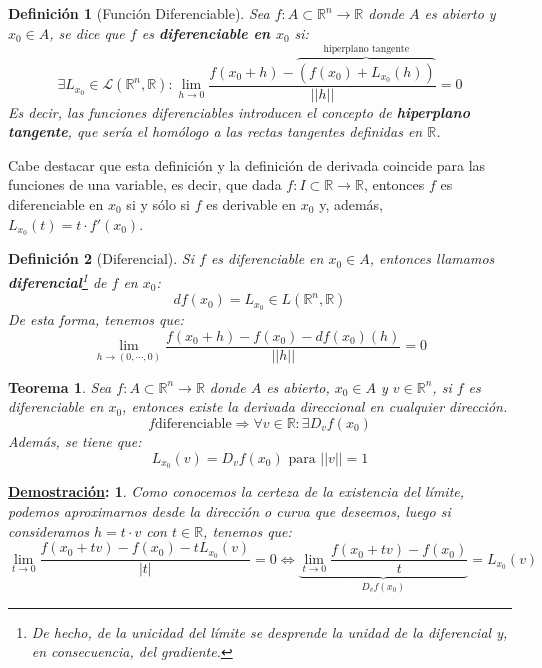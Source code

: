 \documentclass[10pt,a4paper,openright]{book}
\theoremstyle{break}
\newtheorem*{defi}{Definición}
\newtheorem*{theo}{Teorema}
\newtheorem*{demo}{\underline{Demostración}:}
\begin{document}
\begin{defi}[Función Diferenciable]
Sea $f: A \subset \mathbb{R}^n \to \mathbb{R}$ donde $A$ es abierto y $x_0 \in A$, se dice que $f$ es \textbf{diferenciable en $x_0$} si:
$$\exists L_{x_0} \in \mathcal{L}(\mathbb{R}^n, \mathbb{R}) : \lim_{h\rightarrow 0} \frac{f(x_0 + h) - \overbrace{\left( f(x_0) + L_{x_0}(h)\right)}^{\mbox{hiperplano tangente}}}{||h||}  = 0$$
Es decir, las funciones diferenciables introducen el concepto de \textbf{hiperplano tangente}, que sería el homólogo a las rectas tangentes definidas en $\mathbb{R}$.
\end{defi}

Cabe destacar que esta definición y la definición de derivada coincide para las funciones de una variable, es decir, que dada $f: I \subset \mathbb{R} \to \mathbb{R}$, entonces $f$ es diferenciable en $x_0$ si y sólo si $f$ es derivable en $x_0$ y, además, $L_{x_0} (t) = t \cdot f'(x_0)$.

\begin{defi}[Diferencial]
Si $f$ es diferenciable en $x_0\in A$, entonces llamamos \textbf{diferencial}\footnote{De hecho, de la unicidad del límite se desprende la unidad de la diferencial y, en consecuencia, del gradiente.} de $f$ en $x_0$:
$$df(x_0) = L_{x_0}\in L(\mathbb{R}^n, \mathbb{R})$$
De esta forma, tenemos que:
$$\lim_{h\rightarrow (0,\cdots, 0)} \frac{f(x_0+h) -f(x_0) -df(x_0)(h)}{||h||} = 0$$
\end{defi}

\begin{theo}
Sea $f: A \subset \mathbb{R}^n \to \mathbb{R}$ donde $A$ es abierto, $x_0 \in A$ y $v \in \mathbb{R}^n$, si $f$ es diferenciable en $x_0$, entonces existe la derivada direccional en cualquier dirección.
$$f \mbox{diferenciable} \Rightarrow \forall v \in \mathbb R: \exists D_vf(x_0)$$
Además, se tiene que:
$$L_{x_0}(v)= D_v f(x_0) \mbox{ para } ||v|| = 1$$
\end{theo}
\begin{demo}
Como conocemos la certeza de la existencia del límite, podemos aproximarnos desde la dirección o curva que deseemos, luego si consideramos $h = t \cdot v$  con $t \in \mathbb{R}$, tenemos que:
$$\lim_{t\rightarrow 0} \frac{f(x_0 + tv) - f(x_0) - tL_{x_0} (v)}{|t|} = 0 \Leftrightarrow  \underbrace{\lim_{t\rightarrow 0} \frac{f(x_0 + tv) - f(x_0)}{t}}_{D_vf(x_0)} = L_{x_0}(v)$$
\end{demo}
\end{document}
